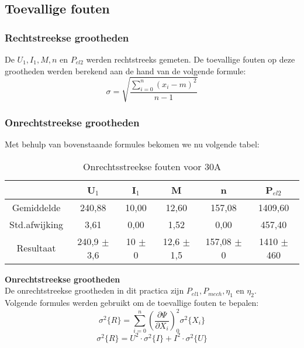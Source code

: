\subsection{Toevallige fouten}
\subsubsection{Rechtstreekse grootheden}
De $U_1,I_1,M,n$ en $P_{el2}$ werden rechtstreeks gemeten. De toevallige fouten
op deze grootheden werden berekend aan de hand van de volgende formule: 
\begin{equation}
    \sigma=\sqrt{\frac{\sum\limits_{i=0}^n(x_i-m)^2}{n-1}}  
\end{equation}

\subsubsection{Onrechtstreekse grootheden}
Met behulp van bovenstaande formules bekomen we nu volgende tabel:

\begin{table}[h]
    \caption{Onrechtsstreekse fouten voor 30A}
    \begin{tabular}{| c | c | c | c | c | c |}
        \hline
                & U$_1$  & I$_1$ & M     & n &  P$_{el2}$ \\ \hline
        Gemiddelde & 240,88 & 10,00 & 12,60 & 157,08 & 1409,60 \\ \hline
        Std.afwijking & 3,61 & 0,00 & 1,52 & 0,00 & 457,40 \\ \hline
        Resultaat & 240,9 $\pm$ 3,6 & 10 $\pm$ 0 & 12,6 $\pm$ 1,5 & 157,08 $\pm$ 0 & 1410 $\pm$ 460 \\ \hline
    \end{tabular}
\end{table}

\noindent \textbf{Onrechtstreekse grootheden}\\
De onrechtstreekse grootheden in dit practica zijn $P_{el1},P_{mech},\eta_{1}$ en
$\eta_2$.\\
Volgende formules werden gebruikt om de toevallige fouten te bepalen:\\
\begin{equation}
    \sigma^2\{R\}=\sum\limits_{i=0}^n\left(\frac{\partial \Psi}{\partial X_i}\right)_0^2 \sigma ^2 \{X_i\}
\end{equation}
\begin{equation*}
    \sigma^2\{R\}=U^2 \cdot \sigma ^2 \{I\} + I^2 \cdot \sigma ^2 \{U\}
\end{equation*}


